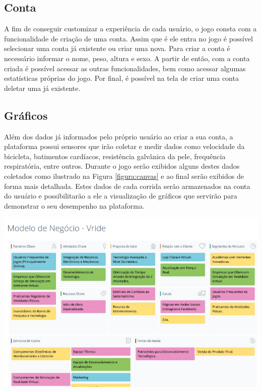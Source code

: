\subsection{Conta}
A fim de conseguir customizar a experiência de cada usuário, o jogo consta com a funcionalidade de criação de uma conta. Assim que é ele entra no jogo é possível selecionar uma conta já existente ou criar uma nova. Para criar a conta é necessário informar o nome, peso, altura e sexo. A partir de então, com a conta criada é possível acessar as outras funcionalidades, bem como acessar algumas estatísticas próprias do jogo. Por final, é possível na tela de criar uma conta deletar uma já existente.

\subsection{Gráficos}
Além dos dados já informados pelo próprio usuário ao criar a sua conta, a plataforma possui sensores que irão coletar e medir dados como velocidade da bicicleta, batimentos cardíacos, resistência galvânica da pele, frequência respiratória, entre outros. Durante o jogo serão exibidos alguns destes dados coletados como ilustrado na Figura \ref{figura:canvas} e ao final serão exibidos de forma mais detalhada. Estes dados de cada corrida serão armazenados na conta do usuário e possibilitarão a ele a visualização de gráficos que servirão para demonstrar o seu desempenho na plataforma.

\begin{center}
	\includegraphics[scale=0.4]{figuras/canvas}
	\label{figura:canvas}
\end{center}

